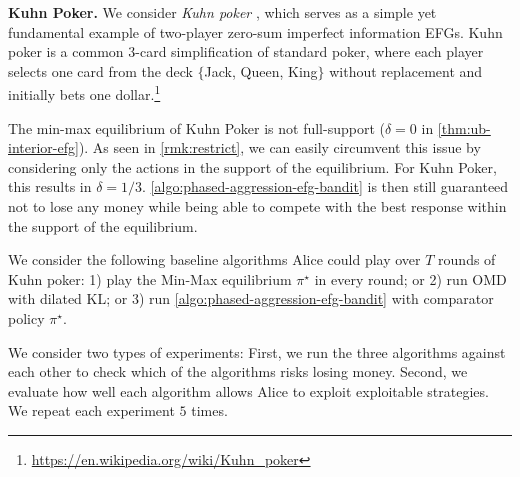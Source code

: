 \documentclass[11pt]{article}
\begin{document}
\textbf{Kuhn Poker.} We consider \emph{Kuhn poker} \citep{kuhn1950simplified}, which serves as a simple yet fundamental example of two-player zero-sum imperfect information EFGs. Kuhn poker is a common $3$-card simplification of standard poker, where each player selects one card from the deck $\{$Jack, Queen, King$\}$ without replacement and initially bets one dollar.\footnote{\url{https://en.wikipedia.org/wiki/Kuhn_poker}} 
\begin{remark}
    The min-max equilibrium of Kuhn Poker is not full-support ($\delta =0$ in \cref{thm:ub-interior-efg}). As seen in \cref{rmk:restrict}, we can easily circumvent this issue by considering only the actions in the support of the equilibrium. For Kuhn Poker, this results in $\delta = 1/3$. \cref{algo:phased-aggression-efg-bandit} is then still guaranteed not to lose any money while being able to compete with the best response within the support of the equilibrium.
\end{remark}
We consider the following baseline algorithms Alice could play over $T$ rounds of Kuhn poker: 1) play the Min-Max equilibrium $\pi^\star$ in every round; or 2) run OMD with dilated KL; or 3) run \cref{algo:phased-aggression-efg-bandit} with comparator policy $\pi^\star$.

We consider two types of experiments: First, we run the three algorithms against each other to check which of the algorithms risks losing money. Second, we evaluate how well each algorithm allows Alice to exploit exploitable strategies. We repeat each experiment $5$ times.
\end{document}
